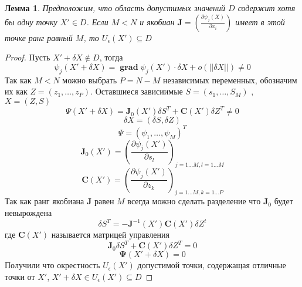 \documentclass[14pt]{extarticle}
\newtheorem{lemma}{Лемма}
\DeclareMathOperator{\grad}{\textbf{grad}}
\begin{document}
\begin{lemma}
	Предположим, что область допустимых значений
	$D$ содержит хотя бы одну точку  $X' \in D$.
	Если  $M < N$ и якобиан  $\mathbf{J} = (\frac{\partial \psi_{j}(X)}{\partial x_{i}})$ 
	имеет в этой точке ранг равный  $M$,
	то  $U_{\epsilon}(X') \subseteq D$
\end{lemma}
\begin{proof}
	Пусть $X' + \delta X \notin D$, тогда
	 \begin{equation}
		\psi_{j}(X' + \delta X) = \grad \psi_{j} (X') \cdot \delta X + o(||\delta X||) \neq 0
	\end{equation}
	Так как $M < N$ можно выбрать  $P = N - M$ независимых переменных,
	обозначим их как  $Z = (z_1,\dots,z_{P})$. Оставшиеся
	зависиимые $S = (s_1,\dots,S_{M})$ , $X = (Z,S)$
	 \begin{equation}
		\Psi(X' + \delta X) = \mathbf{J}_{0}(X')\delta S^{T} +
		\mathbf{C}(X') \delta Z^{T} \neq 0
	\end{equation}
	\begin{equation}
		\delta X = (\delta S , \delta Z)
	\end{equation}
	\begin{equation}
		\Psi = (\psi_{1},\dots,\psi_{M})^{T}
	\end{equation}
	\begin{equation} 
	\mathbf{J}_{0}(X') = (\frac{\partial \psi_{j}(X')}{\partial s_{l}})_{j=1 \dots M,l = 1 \dots M}
	\end{equation} 
	\begin{equation} 
	\mathbf{C}(X') = (\frac{\partial \psi_{j}(X')}{\partial z_{k}})_{j = 1\dots M,k = 1 \dots P} 
	\end{equation} 
	Так как ранг якобиана $\mathbf{J}$ равен $M$ 
	всегда можно сделать разделение что  $\mathbf{J}_{0}$ 
	будет невырождена
	\begin{equation} 
	\delta S^{T}  =
	- \mathbf{J}^{-1}(X')\mathbf{C}(X') \delta Z^{t}
	\end{equation} 
	где $\mathbf{C}(X')$ называется матрицей управления
	\begin{equation} 
	\mathbf{J}_{0} \delta S^{T}  + \mathbf{C}(X') \delta Z^{T} = 0
	\end{equation} 
	\begin{equation} 
	\mathbf{\Psi}(X' + \delta X)  = 0
	\end{equation} 
	Получили что окрестность $U_{\epsilon}(X')$ 
	допустимой точки, содержащая отличные точки от $X'$, $X' + \delta X \in U_{\epsilon}(X') \subseteq D $
\end{proof}
\end{document}

